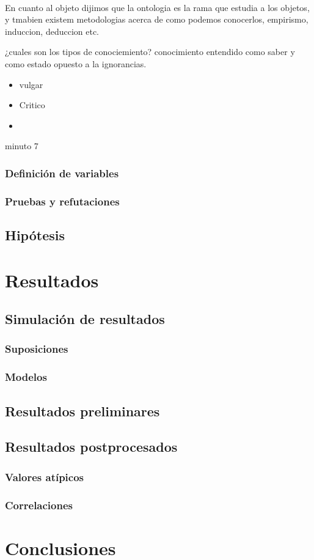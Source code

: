 \documentclass[12pt]{book}
\begin{document}
\\
En cuanto al objeto dijimos que la ontologia es la rama que estudia a los objetos, y tmabien existem metodologias acerca de como podemos conocerlos, empirismo, induccion, deduccion etc.

¿cuales son los tipos de conociemiento? conocimiento entendido como saber y como estado opuesto a la ignorancias.

\begin{itemize}
\item vulgar
\item Critico
\item  
\end{itemize}

minuto 7
\subsection{Definición de variables}
\subsection{Pruebas y refutaciones}
\section{Hipótesis}
\chapter{Resultados}
\section{Simulación de resultados}
\subsection{Suposiciones}
\subsection{Modelos}
\section{Resultados preliminares}
\section{Resultados postprocesados}
\subsection{Valores atípicos}
\subsection{Correlaciones}
\chapter{Conclusiones}
\end{document}
